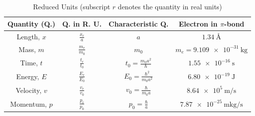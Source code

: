 \documentclass[12pt,a4paper]{article}
\begin{document}
\begin{table}
\caption{Reduced Units (subscript $r$ denotes the quantity in real units)}
\label{tab:reducedUnits}
\begin{tabular}{c|ccc}
Quantity (Q.) & Q. in R. U. & Characteristic Q. & Electron in $\pi$-bond \\ 
\hline 
Length, $x$ & $\frac{x_r}{a}$ & $a$ & $\SI{1,34}{\angstrom}$ \\ 
Mass, $m$ & $\frac{m_r}{m_0}$ & $m_0$ & $m_e = \SI{9,109e-31}{\kilo\gram}$ \\ 
Time, $t$ & $\frac{t_r}{t_0}$ & $t_0 = \frac{m_0 a^2}{\hbar}$ & $\SI{1,55e-16}{\second}$ \\ 
Energy, $E$ & $\frac{E_r}{E_0}$ & $E_0 = \frac{\hbar^2}{m_0 a^2}$ & $\SI{6,80e-19}{\joule}$ \\ 
Velocity, $v$ & $\frac{v_r}{v_0}$ & $v_0 = \frac{\hbar}{m_0 a}$ & $\SI{8,64e5}{\meter\per\second}$ \\ 
Momentum, $p$ & $\frac{p_r}{p_0}$ & $p_0 = \frac{\hbar}{a}$ & $\SI{7,87e-25}{\meter\kilogram\per\second}$ \\ 
\end{tabular} 
\end{table}
\end{document}

